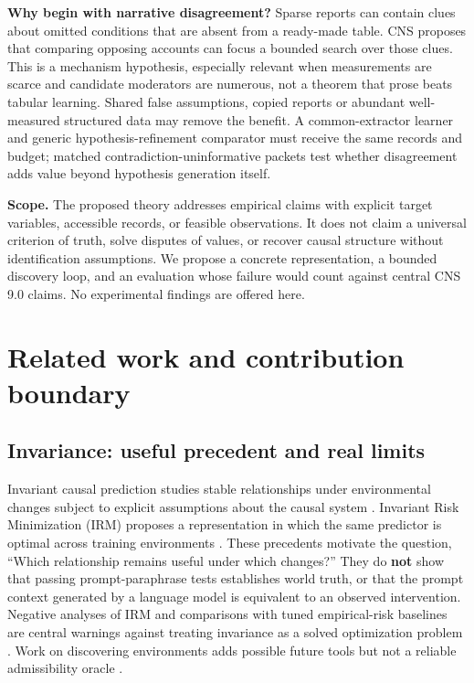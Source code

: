 \documentclass[11pt,a4paper]{article}
\begin{document}
\textbf{Why begin with narrative disagreement?} Sparse reports can
contain clues about omitted conditions that are absent from a ready-made
table. CNS proposes that comparing opposing accounts can focus a bounded
search over those clues. This is a mechanism hypothesis, especially
relevant when measurements are scarce and candidate moderators are
numerous, not a theorem that prose beats tabular learning. Shared false
assumptions, copied reports or abundant well-measured structured data
may remove the benefit. A common-extractor learner and generic
hypothesis-refinement comparator must receive the same records and
budget; matched contradiction-uninformative packets test whether
disagreement adds value beyond hypothesis generation itself.

\textbf{Scope.} The proposed theory addresses empirical claims with
explicit target variables, accessible records, or feasible observations.
It does not claim a universal criterion of truth, solve disputes of
values, or recover causal structure without identification assumptions.
We propose a concrete representation, a bounded discovery loop, and an
evaluation whose failure would count against central CNS 9.0 claims. No
experimental findings are offered here.

\section{Related work and contribution
boundary}\label{related-work-and-contribution-boundary}

\subsection{Invariance: useful precedent and real
limits}\label{invariance-useful-precedent-and-real-limits}

Invariant causal prediction studies stable relationships under
environmental changes subject to explicit assumptions about the causal
system \citep{R03}. Invariant Risk Minimization (IRM) proposes a
representation in which the same predictor is optimal across training
environments \citep{R02}. These precedents motivate the question,
``Which relationship remains useful under which changes?'' They do
\textbf{not} show that passing prompt-paraphrase tests establishes world
truth, or that the prompt context generated by a language model is
equivalent to an observed intervention. Negative analyses of IRM and
comparisons with tuned empirical-risk baselines are central warnings
against treating invariance as a solved optimization problem
\citep{R04, R05, R06}. Work on discovering environments adds possible
future tools but not a reliable admissibility oracle \citep{R07}.
\end{document}
